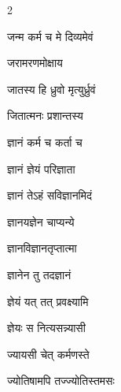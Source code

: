 \begin{multicols}{2}
\begin{indexlist}
\item जन्म कर्म च मे दिव्यमेवं \dotfill {}
\item जरामरणमोक्षाय \dotfill {}
\item जातस्य हि ध्रुवो मृत्युर्ध्रुवं \dotfill {}
\item जितात्मनः प्रशान्तस्य \dotfill {}
\item ज्ञानं कर्म च कर्ता च \dotfill {}
\item ज्ञानं ज्ञेयं परिज्ञाता \dotfill {}
\item ज्ञानं तेऽहं सविज्ञानमिदं \dotfill {}
\item ज्ञानयज्ञेन चाप्यन्ये \dotfill {}
\item ज्ञानविज्ञानतृप्तात्मा \dotfill {}
\item ज्ञानेन तु तदज्ञानं \dotfill {}
\item ज्ञेयं यत् तत् प्रवक्ष्यामि \dotfill {}
\item ज्ञेयः स नित्यसन्न्यासी \dotfill {}
\item ज्यायसी चेत् कर्मणस्ते \dotfill {}
\item ज्योतिषामपि तज्ज्योतिस्तमसः \dotfill {}
\end{indexlist}


\end{multicols}
